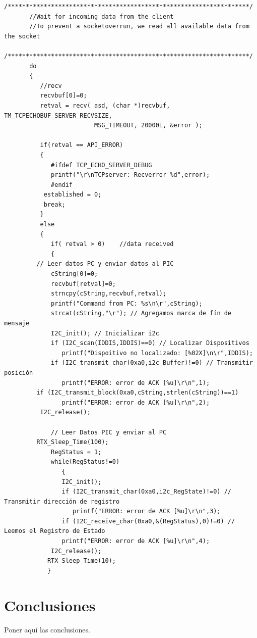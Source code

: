 \begin{Verbatim}[fontsize=\scriptsize]
       /*******************************************************************/
       //Wait for incoming data from the client
       //To prevent a socketoverrun, we read all available data from the socket
       /*******************************************************************/
       do
       {
          //recv
          recvbuf[0]=0;
          retval = recv( asd, (char *)recvbuf, TM_TCPECHOBUF_SERVER_RECVSIZE,
                         MSG_TIMEOUT, 20000L, &error );

          if(retval == API_ERROR)
          {
             #ifdef TCP_ECHO_SERVER_DEBUG
             printf("\r\nTCPserver: Recverror %d",error);
             #endif
           established = 0;
           break;
          }
          else
          {
             if( retval > 0)    //data received
             {
         // Leer datos PC y enviar datos al PIC
             cString[0]=0;
             recvbuf[retval]=0;
             strncpy(cString,recvbuf,retval);
             printf("Command from PC: %s\n\r",cString);
             strcat(cString,"\r"); // Agregamos marca de fín de mensaje
             I2C_init(); // Inicializar i2c
             if (I2C_scan(IDDIS,IDDIS)==0) // Localizar Dispositivos
                printf("Dispoitivo no localizado: [%02X]\n\r",IDDIS);
             if (I2C_transmit_char(0xa0,i2c_Buffer)!=0) // Transmitir posición
                printf("ERROR: error de ACK [%u]\r\n",1);
         if (I2C_transmit_block(0xa0,cString,strlen(cString))==1)
                printf("ERROR: error de ACK [%u]\r\n",2);
          I2C_release();

             // Leer Datos PIC y enviar al PC
         RTX_Sleep_Time(100);
             RegStatus = 1;
             while(RegStatus!=0)
                {
                I2C_init();
                if (I2C_transmit_char(0xa0,i2c_RegState)!=0) // Transmitir dirección de registro
                   printf("ERROR: error de ACK [%u]\r\n",3);
                if (I2C_receive_char(0xa0,&(RegStatus),0)!=0) // Leemos el Registro de Estado
                printf("ERROR: error de ACK [%u]\r\n",4);
             I2C_release();
            RTX_Sleep_Time(10);
            }
\end{Verbatim}

\section{Conclusiones}

Poner aquí las conclusiones.


